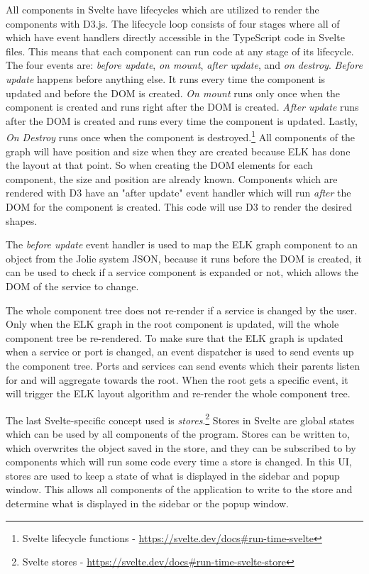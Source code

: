 All components in Svelte have lifecycles which are utilized to render the components with D3.js.
The lifecycle loop consists of four stages where all of which have event handlers directly accessible in the TypeScript code in Svelte files. This means that each component can run code at any stage of its lifecycle.
The four events are: \textit{before update}, \textit{on mount}, \textit{after update}, and \textit{on destroy}.
\textit{Before update} happens before anything else. It runs every time the component is updated and before the DOM is created.
\textit{On mount} runs only once when the component is created and runs right after the DOM is created. 
\textit{After update} runs after the DOM is created and runs every time the component is updated.
Lastly, \textit{On Destroy} runs once when the component is destroyed.\footnote{Svelte lifecycle functions - \url{https://svelte.dev/docs\#run-time-svelte}}
All components of the graph will have position and size when they are created because ELK has done the layout at that point.
So when creating the DOM elements for each component, the size and position are already known.
Components which are rendered with D3 have an "after update" event handler which will run \textit{after} the DOM for the component is created. This code will use D3 to render the desired shapes.

The \textit{before update} event handler is used to map the ELK graph component to an object from the Jolie system JSON, because it runs before the DOM is created, it can be used to check if a service component is expanded or not, which allows the DOM of the service to change.

The whole component tree does not re-render if a service is changed by the user. Only when the ELK graph in the root component is updated, will the whole component tree be re-rendered. To make sure that the ELK graph is updated when a service or port is changed, an event dispatcher is used to 
send events up the component tree. Ports and services can send events which their parents listen for and will aggregate towards the root. When the root gets a specific event, it will trigger the ELK layout algorithm and re-render the whole component tree.

The last Svelte-specific concept used is \textit{stores}.\footnote{Svelte stores - \url{https://svelte.dev/docs\#run-time-svelte-store}} Stores in Svelte are global states which can be used by all components of the program. Stores can be written to, which overwrites the object saved in the store, and they can be subscribed to by components which will run some code every time a store is changed.
In this UI, stores are used to keep a state of what is displayed in the sidebar and popup window. This allows all components of the application to write to the store and determine what is displayed in the sidebar or the popup window. 

